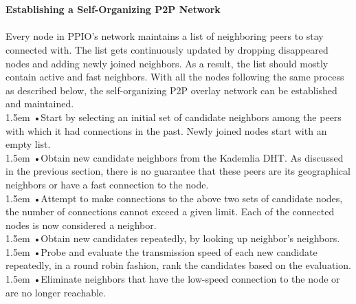 \documentclass[10pt,a4paper]{article}
\begin{document}
\vspace{-0.5em}
\\ \\{\bf Establishing a Self-Organizing P2P Network}
\vspace{-0.5em}
\\ \\Every node in PPIO’s network maintains a list of neighboring peers to stay connected with. The list gets continuously updated by dropping disappeared nodes and adding newly joined neighbors. As a result, the list should mostly contain active and fast neighbors. With all the nodes following the same process as described below, the self-organizing P2P overlay network can be established and maintained.
\vspace{-0.8em}
\\

\hangindent 1.5em
\noindent   
•\quad Start by selecting an initial set of candidate neighbors among the peers with which it had connections in the past. Newly joined nodes start with an empty list.
\vspace{-0.8em}
\\

\hangindent 1.5em
\noindent   
•\quad Obtain new candidate neighbors from the Kademlia DHT. As discussed in the previous section, there is no guarantee that these peers are its geographical neighbors or have a fast connection to the node.
\vspace{-0.8em}
\\

\hangindent 1.5em
\noindent   
•\quad Attempt to make connections to the above two sets of candidate nodes, the number of connections cannot exceed a given limit. Each of the connected nodes is now considered a neighbor.
\vspace{-0.8em}
\\

\hangindent 1.5em
\noindent   
•\quad Obtain new candidates repeatedly, by looking up neighbor's neighbors.
\vspace{-0.8em}
\\

\hangindent 1.5em
\noindent   
•\quad Probe and evaluate the transmission speed of each new candidate repeatedly, in a round robin fashion, rank the candidates based on the evaluation.
\vspace{-0.8em}
\\

\hangindent 1.5em
\noindent   
•\quad Eliminate neighbors that have the low-speed connection to the node or are no longer reachable.
\vspace{-0.8em}
\\
\end{document}
